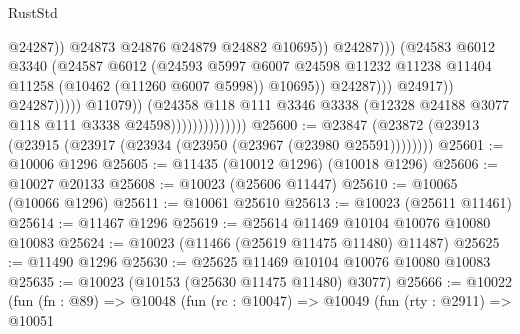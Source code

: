 \begin{lexlean}{RustStd}
\begin{coremodule}
                                                                @24287))
                                                            @24873
                                                            @24876
                                                            @24879
                                                            @24882
                                                            @10695))
                                                        @24287)))
                                                  (@24583
                                                    @6012
                                                    @3340
                                                    (@24587
                                                      @6012
                                                      (@24593
                                                        @5997
                                                        @6007
                                                        @24598
                                                        @11232
                                                        @11238
                                                        @11404
                                                        @11258
                                                        (@10462 (@11260 @6007 @5998))
                                                        @10695))
                                                    @24287)))
                                              @24917))
                                          @24287)))))
                                @11079))
                            (@24358
                              @118
                              @111
                              @3346
                              @3338
                              (@12328 @24188 @3077 @118 @111 @3338 @24598))))))))))))))
@25600 := @23847 (@23872 (@23913 (@23915 (@23917 (@23934 (@23950 (@23967 (@23980 @25591))))))))
@25601 := @10006 @1296
@25605 := @11435 (@10012 @1296) (@10018 @1296)
@25606 := @10027 @20133
@25608 := @10023 (@25606 @11447)
@25610 := @10065 (@10066 @1296)
@25611 := @10061 @25610
@25613 := @10023 (@25611 @11461)
@25614 := @11467 @1296
@25619 := @25614 @11469 @10104 @10076 @10080 @10083
@25624 := @10023 (@11466 (@25619 @11475 @11480) @11487)
@25625 := @11490 @1296
@25630 := @25625 @11469 @10104 @10076 @10080 @10083
@25635 := @10023 (@10153 (@25630 @11475 @11480) @3077)
@25666 := @10022
    (fun (fn : @89) =>
    @10048
      (fun (rc : @10047) =>
      @10049
        (fun (rty : @2911) =>
        @10051

\end{coremodule}
\end{lexlean}
